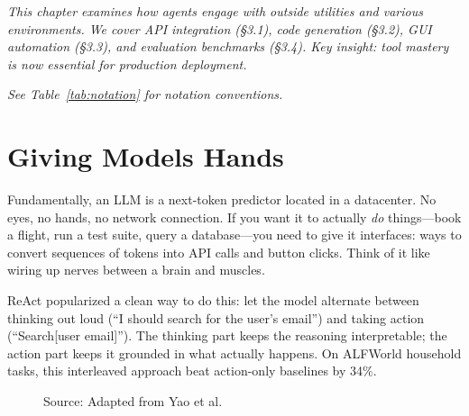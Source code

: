 \documentclass[12pt,a4paper]{report}
\theoremstyle{definition}
\newcommand{\source}[1]{\vspace{-0.5\baselineskip}\caption*{\small Source: #1}}
\begin{document}
\textit{This chapter examines how agents engage with outside utilities and various environments.
 We cover API integration (\S3.1), code generation (\S3.2), GUI automation (\S3.3), and evaluation benchmarks (\S3.4). Key insight: tool mastery is now essential for production deployment.}

\vspace{0.3cm}

\noindent\textit{See Table~\ref{tab:notation} for notation conventions.}

\section{Giving Models Hands}
Fundamentally, an LLM is a next-token predictor located in a datacenter. No eyes, no hands, no network connection. If you want it to actually \textit{do} things---book a flight, run a test suite, query a database---you need to give it interfaces: ways to convert sequences of tokens into API calls and button clicks.
 Think of it like wiring up nerves between a brain and muscles.

ReAct \cite{yao2023react} popularized a clean way to do this: let the model alternate between thinking out loud (``I should search for the user's email'') and taking action (``Search[user email]''). The thinking part keeps the reasoning interpretable; the action part keeps it grounded in what actually happens. On ALFWorld household tasks, this interleaved approach beat action-only baselines by 34\%.

\begin{figure}[htbp]
\centering
{}
\caption{How agentic workflows connect LLM-based logic, tool integration, environment feedback, and memory.
 The agent sharpens its actions step by step based on what it observes.}
\label{fig:agentic_workflow}
\source{Adapted from Yao et al.~\cite{yao2023react}}
\end{figure}
\end{document}
